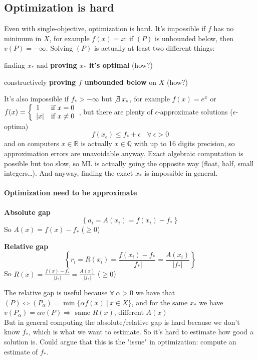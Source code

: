 \documentclass[10pt]{report}
\begin{document}
\subsection{Optimization is hard}
Even with single-objective, optimization is hard. It's impossible if $f$ has no minimum in $X$, for example $f(x) = x$: if $(P)$ is unbounded below, then $v(P) = -\infty$. Solving $(P)$ is actually at least two different things:
\begin{list}{}{}
	\item finding $x_*$ and \textbf{proving $x_*$ it's optimal} (how?)
	\item constructively \textbf{proving $f$ unbounded below} on $X$ (how?)
\end{list}
It's also impossible if $f_* > -\infty$ but $\not\exists\:x_*$, for example $f(x) = e^x$ or $f(x)=\left\{\begin{array}{l l}
1&\text{if }x = 0\\
|x|&\text{if }x \neq 0
\end{array}\right.$, but there are plenty of $\epsilon$-approximate solutions ($\epsilon$-optima) $$f(x_\epsilon)\leq f_* + \epsilon\:\:\:\:\forall\:\epsilon>0$$
and on computers $x\in \mathbb{R}$ is actually $x\in \mathbb{Q}$ with up to 16 digits precision, so approximation errors are unavoidable anyway. Exact algebraic computation is possible but too slow, so ML is actually going the opposite way (float, half, small integers\ldots). And anyway, finding the exact $x_*$ is impossible in general.
\paragraph{Optimization need to be approximate} \begin{list}{}{}
	\item \textbf{Absolute gap} $$\left\{a_i = A(x_i) = f(x_i) - f_*\right\}$$ So $A(x) = f(x) - f_*$ ($\geq 0$)
	\item \textbf{Relative gap} $$\left\{r_i = R(x_i) = \frac{f(x_i) - f_*}{|f_*|} = \frac{A(x_i)}{|f_*|}\right\}$$ So $R(x) = \frac{\displaystyle f(x) - f_*}{\displaystyle |f_*|} = \frac{\displaystyle A(x)}{\displaystyle |f_*|}$ ($\geq 0$)
\end{list}
The relative gap is useful because $\forall\:\alpha>0$ we have that $(P)\Leftrightarrow (P_\alpha) = \min\{\alpha f(x)\:|\:x\in X\}$, and for the same $x_*$ we have $v(P_\alpha) = \alpha v(P) \Rightarrow$ same $R(x)$, different $A(x)$\\
But in general computing the absolute/relative gap is hard because we don't know $f_*$, which is what we want to estimate. So it's hard to estimate how good a solution is. Could argue that this is the "issue" in optimization: compute an estimate of $f_*$.
\end{document}
